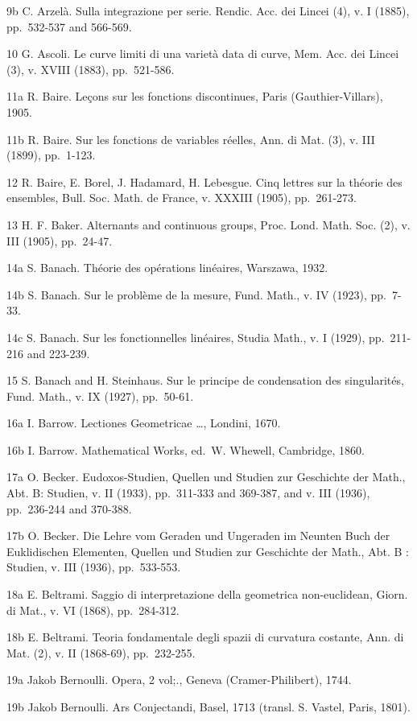 9b C. Arzelà. Sulla integrazione per serie. Rendic. Acc. dei Lincei (4), v. I (1885), pp.~532-537 and 566-569.

10 G. Ascoli. Le curve limiti di una varietà data di curve, Mem. Acc. dei Lincei (3), v. XVIII (1883), pp.~521-586.

11a R. Baire. Leçons sur les fonctions discontinues, Paris (Gauthier-Villars), 1905.

11b R. Baire. Sur les fonctions de variables réelles, Ann. di Mat. (3), v. III (1899), pp.~1-123.

12 R. Baire, E. Borel, J. Hadamard, H. Lebesgue. Cinq lettres sur la théorie des ensembles, Bull. Soc. Math. de France, v. XXXIII (1905), pp.~261-273.

13 H. F. Baker. Alternants and continuous groups, Proc. Lond. Math. Soc. (2), v. III (1905), pp.~24-47.

14a S. Banach. Théorie des opérations linéaires, Warszawa, 1932.

14b S. Banach. Sur le problème de la mesure, Fund. Math., v. IV (1923), pp.~7-33.

14c S. Banach. Sur les fonctionnelles linéaires, Studia Math., v. I (1929), pp.~211-216 and 223-239.

15 S. Banach and H. Steinhaus. Sur le principe de condensation des singularités, Fund. Math., v. IX (1927), pp.~50-61.

16a I. Barrow. Lectiones Geometricae \ldots, Londini, 1670.

16b I. Barrow. Mathematical Works, ed.~W. Whewell, Cambridge, 1860.

17a O. Becker. Eudoxos-Studien, Quellen und Studien zur Geschichte der Math., Abt. B: Studien, v. II (1933), pp.~311-333 and 369-387, and v. III (1936), pp.~236-244 and 370-388.

17b O. Becker. Die Lehre vom Geraden und Ungeraden im Neunten Buch der Euklidischen Elementen, Quellen und Studien zur Geschichte der Math., Abt. B : Studien, v. III (1936), pp.~533-553.

18a E. Beltrami. Saggio di interpretazione della geometrica non-euclidean, Giorn. di Mat., v. VI (1868), pp.~284-312.

18b E. Beltrami. Teoria fondamentale degli spazii di curvatura costante, Ann. di Mat. (2), v. II (1868-69), pp.~232-255.

19a Jakob Bernoulli. Opera, 2 vol;., Geneva (Cramer-Philibert), 1744.

19b Jakob Bernoulli. Ars Conjectandi, Basel, 1713 (transl. S. Vastel, Paris, 1801).

